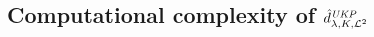 \documentclass{article} %
\newcommand{\metricstname}{UKP }
\newcommand{\dtwohat}{\hat{d}_{\lambda,K,\mathcal{L}^{2}}^{\emph{\metricstname}}}
\theoremstyle{plain}
\begin{document}














\subsection{Computational complexity of $\dtwohat$}\label{Computational Complexity}
\end{document}
